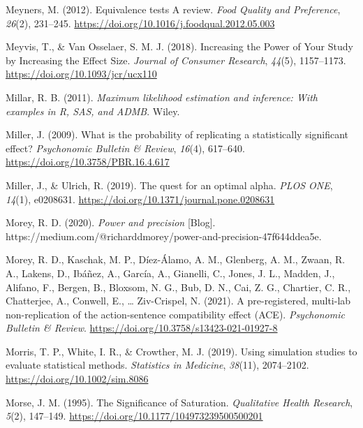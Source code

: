 \documentclass[
  oneside]{krantz}
\newlength{\cslhangindent}
\newlength{\cslentryspacingunit} %
\newenvironment{CSLReferences}[2] %
 {%
  \setlength{\parindent}{0pt}
  \ifodd #1
  \let\oldpar\par
  \def\par{\hangindent=\cslhangindent\oldpar}
  \fi
  \setlength{\parskip}{#2\cslentryspacingunit}
 }%
 {}
\begin{document}
\begin{CSLReferences}{1}{0}
\leavevmode{}%
Meyners, M. (2012). Equivalence tests \textendash{} {A} review.
\emph{Food Quality and Preference}, \emph{26}(2), 231--245.
\url{https://doi.org/10.1016/j.foodqual.2012.05.003}

\leavevmode{}%
Meyvis, T., \& Van Osselaer, S. M. J. (2018). Increasing the {Power} of
{Your Study} by {Increasing} the {Effect Size}. \emph{Journal of
Consumer Research}, \emph{44}(5), 1157--1173.
\url{https://doi.org/10.1093/jcr/ucx110}

\leavevmode{}%
Millar, R. B. (2011). \emph{Maximum likelihood estimation and inference:
With examples in {R}, {SAS}, and {ADMB}}. {Wiley}.

\leavevmode{}%
Miller, J. (2009). What is the probability of replicating a
statistically significant effect? \emph{Psychonomic Bulletin \& Review},
\emph{16}(4), 617--640. \url{https://doi.org/10.3758/PBR.16.4.617}

\leavevmode{}%
Miller, J., \& Ulrich, R. (2019). The quest for an optimal alpha.
\emph{PLOS ONE}, \emph{14}(1), e0208631.
\url{https://doi.org/10.1371/journal.pone.0208631}

\leavevmode{}%
Morey, R. D. (2020). \emph{Power and precision} {[}Blog{]}.
https://medium.com/@richarddmorey/power-and-precision-47f644ddea5e.

\leavevmode{}%
Morey, R. D., Kaschak, M. P., Díez-Álamo, A. M., Glenberg, A. M., Zwaan,
R. A., Lakens, D., Ibáñez, A., García, A., Gianelli, C., Jones, J. L.,
Madden, J., Alifano, F., Bergen, B., Bloxsom, N. G., Bub, D. N., Cai, Z.
G., Chartier, C. R., Chatterjee, A., Conwell, E., \ldots{} Ziv-Crispel,
N. (2021). A pre-registered, multi-lab non-replication of the
action-sentence compatibility effect ({ACE}). \emph{Psychonomic Bulletin
\& Review}. \url{https://doi.org/10.3758/s13423-021-01927-8}

\leavevmode{}%
Morris, T. P., White, I. R., \& Crowther, M. J. (2019). Using simulation
studies to evaluate statistical methods. \emph{Statistics in Medicine},
\emph{38}(11), 2074--2102. \url{https://doi.org/10.1002/sim.8086}

\leavevmode{}%
Morse, J. M. (1995). The {Significance} of {Saturation}.
\emph{Qualitative Health Research}, \emph{5}(2), 147--149.
\url{https://doi.org/10.1177/104973239500500201}


\end{CSLReferences}
\end{document}
